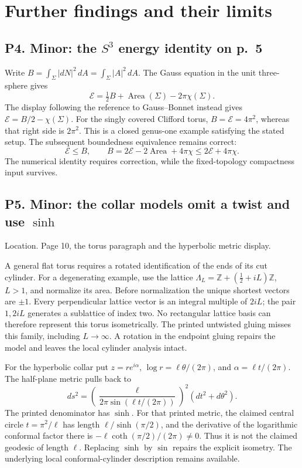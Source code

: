 \documentclass[10pt]{article}
\begin{document}
\section*{Further findings and their limits}
\subsection*{P4. Minor: the \(S^3\) energy identity on p. 5}
Write \(B=\int_\Sigma|dN|^2\,dA=\int_\Sigma|A|^2\,dA\). The Gauss equation in the unit three-sphere gives \[\mathcal E=\tfrac12B+\operatorname{Area}(\Sigma)-2\pi\chi(\Sigma).
 \tag{P4.1}\] The display following the reference to Gauss–Bonnet instead gives \(\mathcal E=B/2-\chi(\Sigma)\). For the singly covered Clifford torus, \(B=\mathcal E=4\pi^2\), whereas that right side is \(2\pi^2\). This is a closed genus-one example satisfying the stated setup. The subsequent boundedness equivalence remains correct: \[\mathcal E\le B,\qquad B=2\mathcal E-2\operatorname{Area}+4\pi\chi
                    \le2\mathcal E+4\pi\chi .\] The numerical identity requires correction, while the fixed-topology compactness input survives.\par
\subsection*{P5. Minor: the collar models omit a twist and use \(\sinh\)}
Location. Page 10, the torus paragraph and the hyperbolic metric display.\par
A general flat torus requires a rotated identification of the ends of its cut cylinder. For a degenerating example, use the lattice \(\Lambda_L=\mathbb Z+(\tfrac12+iL)\mathbb Z\), \(L>1\), and normalize its area. Before normalization the unique shortest vectors are \(\pm1\). Every perpendicular lattice vector is an integral multiple of \(2iL\); the pair \(1,2iL\) generates a sublattice of index two. No rectangular lattice basis can therefore represent this torus isometrically. The printed untwisted gluing misses this family, including \(L\to\infty\). A rotation in the endpoint gluing repairs the model and leaves the local cylinder analysis intact.\par
For the hyperbolic collar put \(z=re^{i\alpha}\), \(\log r=\ell\theta/(2\pi)\), and \(\alpha=\ell t/(2\pi)\). The half-plane metric pulls back to \[ds^2=\left(\frac{\ell}{2\pi\sin(\ell t/(2\pi))}\right)^2
                  (dt^2+d\theta^2).
 \tag{P5.1}\] The printed denominator has \(\sinh\). For that printed metric, the claimed central circle \(t=\pi^2/\ell\) has length \(\ell/\sinh(\pi/2)\), and the derivative of the logarithmic conformal factor there is \(-\ell\coth(\pi/2)/(2\pi)\ne0\). Thus it is not the claimed geodesic of length \(\ell\). Replacing \(\sinh\) by \(\sin\) repairs the explicit isometry. The underlying local conformal-cylinder description remains available.\par
\end{document}
